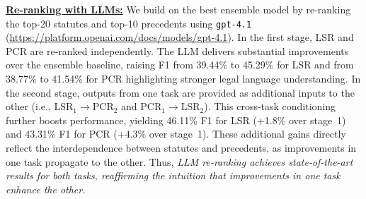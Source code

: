 \vspace{1mm}
\noindent\underline{\textbf{Re-ranking with LLMs:}}
We build on the best ensemble model by re-ranking the top-20 statutes and top-10 precedents using \texttt{gpt-4.1} (\url{https://platform.openai.com/docs/models/gpt-4.1}). In the first stage, LSR and PCR are re-ranked independently. The LLM delivers substantial improvements over the ensemble baseline, raising F1 from 39.44\% to 45.29\% for LSR and from 38.77\% to 41.54\% for PCR highlighting stronger legal language understanding.  
In the second stage, outputs from one task are provided as additional inputs to the other (i.e., $\textrm{LSR}_1 \rightarrow \textrm{PCR}_2$ and $\textrm{PCR}_1 \rightarrow \textrm{LSR}_2$). This cross-task conditioning further boosts performance, yielding 46.11\% F1 for LSR (+1.8\% over stage~1) and 43.31\% F1 for PCR (+4.3\% over stage~1). These additional gains directly reflect the interdependence between statutes and precedents, as improvements in one task propagate to the other.
Thus, \textit{LLM re-ranking achieves state-of-the-art results for both tasks, reaffirming the intuition that improvements in one task enhance the other.}



